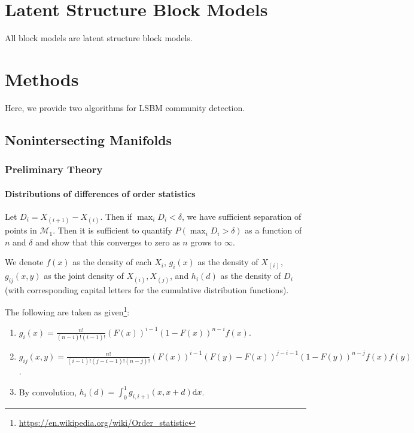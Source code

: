 \documentclass[12pt]{article}
\providecommand{\tightlist}{%
  \setlength{\itemsep}{0pt}\setlength{\parskip}{0pt}}
\begin{document}
\hypertarget{latent-structure-block-models}{%
\section{Latent Structure Block
Models}\label{latent-structure-block-models}}

All block models are latent structure block models.

\hypertarget{methods}{%
\section{Methods}\label{methods}}

Here, we provide two algorithms for LSBM community detection.

\hypertarget{nonintersecting-manifolds}{%
\subsection{Nonintersecting Manifolds}\label{nonintersecting-manifolds}}

\hypertarget{preliminary-theory}{%
\subsubsection{Preliminary Theory}\label{preliminary-theory}}

\hypertarget{distributions-of-differences-of-order-statistics}{%
\paragraph{Distributions of differences of order
statistics}\label{distributions-of-differences-of-order-statistics}}

Let \(D_i = X_{(i+1)} - X_{(i)}\). Then if \(\max_i D_i < \delta\), we
have sufficient separation of points in \(\mathcal{M}_1\). Then it is
sufficient to quantify \(P(\max_i D_i > \delta)\) as a function of \(n\)
and \(\delta\) and show that this converges to zero as \(n\) grows to
\(\infty\).

We denote \(f(x)\) as the density of each \(X_i\), \(g_i(x)\) as the
density of \(X_{(i)}\), \(g_{ij}(x, y)\) as the joint density of
\(X_{(i)}, X_{(j)}\), and \(h_i(d)\) as the density of \(D_i\) (with
corresponding capital letters for the cumulative distribution
functions).

The following are taken as given\footnote{\url{https://en.wikipedia.org/wiki/Order_statistic}}:

\begin{enumerate}
\def\labelenumi{\arabic{enumi}.}
\tightlist
\item
  \(g_i(x) = \frac{n!}{(n-i)! (i-1)!} (F(x))^{i-1} (1 - F(x))^{n-i} f(x)\).
\item
  \(g_{ij}(x, y) = \frac{n!}{(i-1)! (j-i-1)! (n-j)!} (F(x))^{i-1} (F(y) - F(x))^{j-i-1} (1 - F(y))^{n-j} f(x) f(y)\).
\item
  By convolution,
  \(h_i(d) = \int_0^{1} g_{i, i+1} (x, x + d) \mathrm{d}x\).
\end{enumerate}
\end{document}
